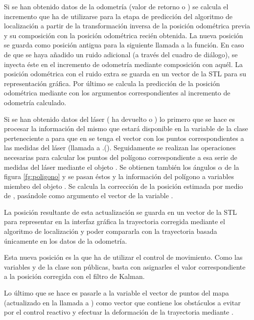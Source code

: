 Si se han obtenido datos de la odometría (valor de retorno  o ) se calcula el incremento que ha de utilizarse para la etapa de predicción del algoritmo de localización a partir de la transformación inversa de la posición odométrica previa y su composición con la posición odométrica recién obtenida. La nueva posición se guarda como posición antigua para la siguiente llamada a la función. En caso de que se haya añadido un ruido adicional (a través del cuadro de diálogo), se inyecta éste en el incremento de odometría mediante composición con aquél. La posición odométrica con el ruido extra se guarda en un vector de la STL para su representación gráfica. Por último se calcula la predicción de la posición odométrica mediante  con los argumentos correspondientes al incremento de odometría calculado.

Si se han obtenido datos del láser ( ha devuelto  o ) lo primero que se hace es procesar la información del mismo que estará disponible en la variable de la clase  perteneciente a  para que en  se tenga el vector  con los puntos correspondientes a las medidas del láser (llamada a .().
Seguidamente se realizan las operaciones necesarias para calcular los puntos del polígono correspondiente a esa serie de medidas del láser mediante el objeto . Se obtienen también los ángulos $\alpha$ de la figura \ref{fg:poligono} y se pasan éstos y la información del polígono a variables miembro del objeto . Se calcula la corrección de la posición estimada por medio de , pasándole como argumento el vector  de la variable .

La posición resultante de esta actualización se guarda en un vector de la STL para representar en la interfaz gráfica la trayectoria corregida mediante el algoritmo de localización y poder compararla con la trayectoria basada únicamente en los datos de la odometría.

Esta nueva posición es la que ha de utilizar el control de movimiento. Como las variables  y  de la clase  son públicas, basta con asignarles el valor correspondiente a la posición corregida con el filtro de Kalman.

Lo último que se hace es pasarle a la variable  el vector de puntos del mapa (actualizado en la llamada a ) como vector que contiene los obstáculos a evitar por el control reactivo y efectuar la deformación de la trayectoria mediante .

